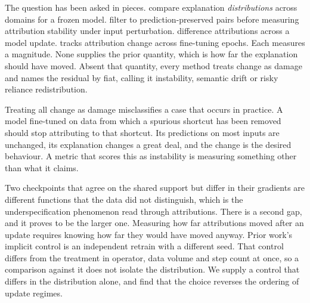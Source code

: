 \documentclass{article}
\begin{document}
The question has been asked in pieces. \citet{mougan2025} compare explanation \emph{distributions}
across domains for a frozen model. \citet{fass2026} filter to prediction-preserved pairs before
measuring attribution stability under input perturbation. \citet{deltaaudit2025} difference
attributions across a model update. \citet{rsp2026} tracks attribution change across fine-tuning
epochs. Each measures a magnitude. None supplies the prior quantity, which is how far the
explanation should have moved. Absent that quantity, every method treats change as damage and names
the residual by fiat, calling it instability, semantic drift or risky reliance redistribution.

Treating all change as damage misclassifies a case that occurs in practice. A model fine-tuned on
data from which a spurious shortcut has been removed should stop attributing to that shortcut. Its
predictions on most inputs are unchanged, its explanation changes a great deal, and the change is
the desired behaviour. A metric that scores this as instability is measuring something other than
what it claims.

Two checkpoints that agree on the shared support but differ in their gradients are different
functions that the data did not distinguish, which is the underspecification phenomenon
\citep{damour2020} read through attributions. There is a second gap, and it proves to be the larger
one. Measuring how far attributions moved after
an update requires knowing how far they would have moved anyway. Prior work's implicit control is an
independent retrain with a different seed. That control differs from the treatment in operator, data
volume and step count at once, so a comparison against it does not isolate the distribution. We
supply a control that differs in the distribution alone, and find that the choice reverses the
ordering of update regimes.
\end{document}
